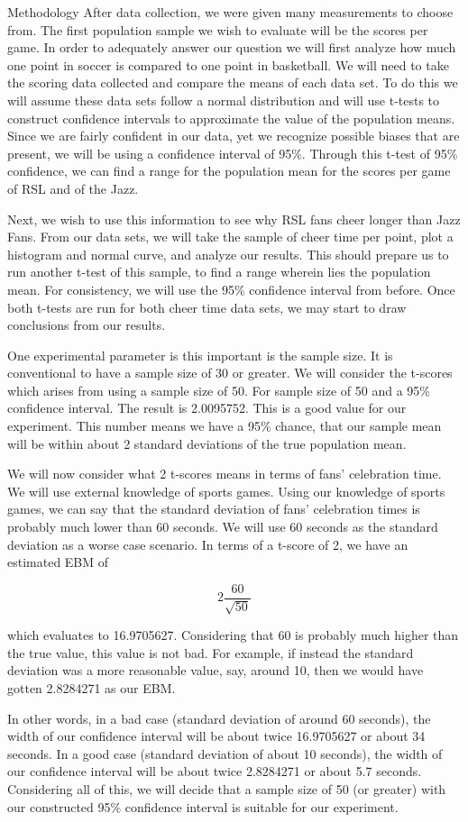 \documentclass[
  ignorenonframetext,
]{beamer}
\begin{document}
\begin{frame}{Methodology}
\protect\hypertarget{methodology}{}
After data collection, we were given many measurements to choose from.
The first population sample we wish to evaluate will be the scores per
game. In order to adequately answer our question we will first analyze
how much one point in soccer is compared to one point in basketball. We
will need to take the scoring data collected and compare the means of
each data set. To do this we will assume these data sets follow a normal
distribution and will use t-tests to construct confidence intervals to
approximate the value of the population means. Since we are fairly
confident in our data, yet we recognize possible biases that are
present, we will be using a confidence interval of 95\%. Through this
t-test of 95\% confidence, we can find a range for the population mean
for the scores per game of RSL and of the Jazz.

Next, we wish to use this information to see why RSL fans cheer longer
than Jazz Fans. From our data sets, we will take the sample of cheer
time per point, plot a histogram and normal curve, and analyze our
results. This should prepare us to run another t-test of this sample, to
find a range wherein lies the population mean. For consistency, we will
use the 95\% confidence interval from before. Once both t-tests are run
for both cheer time data sets, we may start to draw conclusions from our
results.

One experimental parameter is this important is the sample size. It is
conventional to have a sample size of 30 or greater. We will consider
the t-scores which arises from using a sample size of 50. For sample
size of 50 and a 95\% confidence interval. The result is 2.0095752. This
is a good value for our experiment. This number means we have a 95\%
chance, that our sample mean will be within about 2 standard deviations
of the true population mean.

We will now consider what 2 t-scores means in terms of fans' celebration
time. We will use external knowledge of sports games. Using our
knowledge of sports games, we can say that the standard deviation of
fans' celebration times is probably much lower than 60 seconds. We will
use 60 seconds as the standard deviation as a worse case scenario. In
terms of a t-score of 2, we have an estimated EBM of

\[
2 \frac{60}{\sqrt{50}}
\]

which evaluates to 16.9705627. Considering that 60 is probably much
higher than the true value, this value is not bad. For example, if
instead the standard deviation was a more reasonable value, say, around
10, then we would have gotten 2.8284271 as our EBM.

In other words, in a bad case (standard deviation of around 60 seconds),
the width of our confidence interval will be about twice 16.9705627 or
about 34 seconds. In a good case (standard deviation of about 10
seconds), the width of our confidence interval will be about twice
2.8284271 or about 5.7 seconds. Considering all of this, we will decide
that a sample size of 50 (or greater) with our constructed 95\%
confidence interval is suitable for our experiment.
\end{frame}
\end{document}
